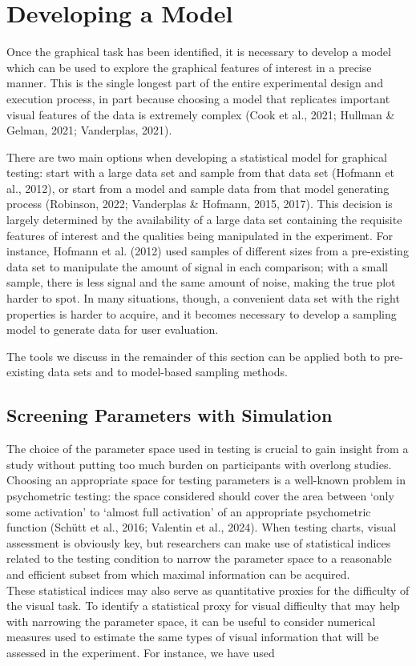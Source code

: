\documentclass[
  10pt,
  letterpaper,
  DIV=11,
  numbers=noendperiod]{scrartcl}
\begin{document}
\section{Developing a Model}\label{sec-model-dev}

Once the graphical task has been identified, it is necessary to develop
a model which can be used to explore the graphical features of interest
in a precise manner. This is the single longest part of the entire
experimental design and execution process, in part because choosing a
model that replicates important visual features of the data is extremely
complex (Cook et al., 2021; Hullman \& Gelman, 2021; Vanderplas, 2021).

There are two main options when developing a statistical model for
graphical testing: start with a large data set and sample from that data
set (Hofmann et al., 2012), or start from a model and sample data from
that model generating process (Robinson, 2022; Vanderplas \& Hofmann,
2015, 2017). This decision is largely determined by the availability of
a large data set containing the requisite features of interest and the
qualities being manipulated in the experiment. For instance, Hofmann et
al. (2012) used samples of different sizes from a pre-existing data set
to manipulate the amount of signal in each comparison; with a small
sample, there is less signal and the same amount of noise, making the
true plot harder to spot. In many situations, though, a convenient data
set with the right properties is harder to acquire, and it becomes
necessary to develop a sampling model to generate data for user
evaluation.

The tools we discuss in the remainder of this section can be applied
both to pre-existing data sets and to model-based sampling methods.

\subsection{Screening Parameters with
Simulation}\label{screening-parameters-with-simulation}

The choice of the parameter space used in testing is crucial to gain
insight from a study without putting too much burden on participants
with overlong studies. Choosing an appropriate space for testing
parameters is a well-known problem in psychometric testing: the space
considered should cover the area between `only some activation' to
`almost full activation' of an appropriate psychometric function (Schütt
et al., 2016; Valentin et al., 2024). When testing charts, visual
assessment is obviously key, but researchers can make use of statistical
indices related to the testing condition to narrow the parameter space
to a reasonable and efficient subset from which maximal information can
be acquired.\\
These statistical indices may also serve as quantitative proxies for the
difficulty of the visual task. To identify a statistical proxy for
visual difficulty that may help with narrowing the parameter space, it
can be useful to consider numerical measures used to estimate the same
types of visual information that will be assessed in the experiment. For
instance, we have used
\end{document}

